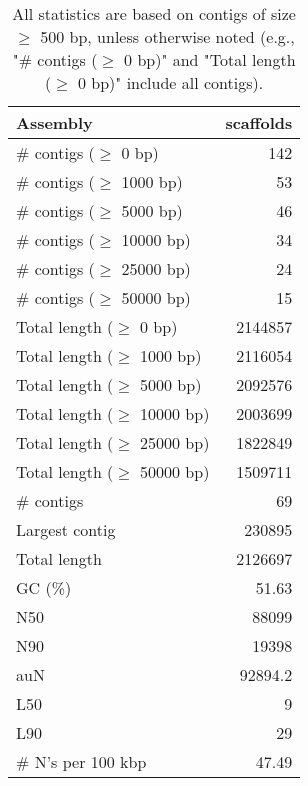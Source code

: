 \documentclass[12pt,a4paper]{article}
\begin{document}
\begin{table}[ht]
\begin{center}
\caption{All statistics are based on contigs of size $\geq$ 500 bp, unless otherwise noted (e.g., "\# contigs ($\geq$ 0 bp)" and "Total length ($\geq$ 0 bp)" include all contigs).}
\begin{tabular}{|l*{1}{|r}|}
\hline
Assembly & scaffolds \\ \hline
\# contigs ($\geq$ 0 bp) & 142 \\ \hline
\# contigs ($\geq$ 1000 bp) & 53 \\ \hline
\# contigs ($\geq$ 5000 bp) & 46 \\ \hline
\# contigs ($\geq$ 10000 bp) & 34 \\ \hline
\# contigs ($\geq$ 25000 bp) & 24 \\ \hline
\# contigs ($\geq$ 50000 bp) & 15 \\ \hline
Total length ($\geq$ 0 bp) & 2144857 \\ \hline
Total length ($\geq$ 1000 bp) & 2116054 \\ \hline
Total length ($\geq$ 5000 bp) & 2092576 \\ \hline
Total length ($\geq$ 10000 bp) & 2003699 \\ \hline
Total length ($\geq$ 25000 bp) & 1822849 \\ \hline
Total length ($\geq$ 50000 bp) & 1509711 \\ \hline
\# contigs & 69 \\ \hline
Largest contig & 230895 \\ \hline
Total length & 2126697 \\ \hline
GC (\%) & 51.63 \\ \hline
N50 & 88099 \\ \hline
N90 & 19398 \\ \hline
auN & 92894.2 \\ \hline
L50 & 9 \\ \hline
L90 & 29 \\ \hline
\# N's per 100 kbp & 47.49 \\ \hline
\end{tabular}
\end{center}
\end{table}
\end{document}
